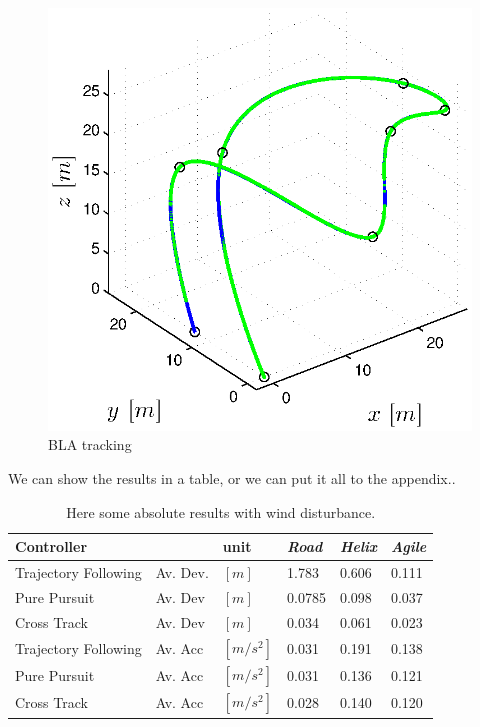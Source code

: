 \begin{figure}[h]
\begin{minipage}[t]{0.32\textwidth}
    \includegraphics[width = \textwidth]{trackings/figure_3D_agile_SplineDegree3_crossTrack_Disturbance_1}
  \end{minipage}
  \caption{BLA tracking }
  \label{fig:results_wind_disturbance}
\end{figure}

We can show the results in a table, or we can put it all to the appendix..

\begin{table}[h]
\begin{center}
 \begin{tabular}{lll|lll}
 \hline
 Controller &   & unit & \textit{Road} & \textit{Helix} & \textit{Agile} \\ \hline \hline
 Trajectory Following & Av. Dev. & $[m]$ & 1.783 & 0.606 & 0.111 \\
 Pure Pursuit         & Av. Dev & $[m]$ & 0.0785 & 0.098 & 0.037 \\
 Cross Track          & Av. Dev & $[m]$ &  0.034 & 0.061 & 0.023 \\
    
 Trajectory Following & Av. Acc & $[m/s^2]$ & 0.031 & 0.191 & 0.138 \\
 Pure Pursuit         & Av. Acc & $[m/s^2]$ & 0.031 & 0.136 & 0.121 \\
 Cross Track          & Av. Acc & $[m/s^2]$ & 0.028 & 0.140 & 0.120 \\
 \hline
 \end{tabular}
 \caption{Here some absolute results with wind disturbance.}\vspace{1px}
 \label{tab:results_model_uncertainties}
\end{center}
\end{table}

